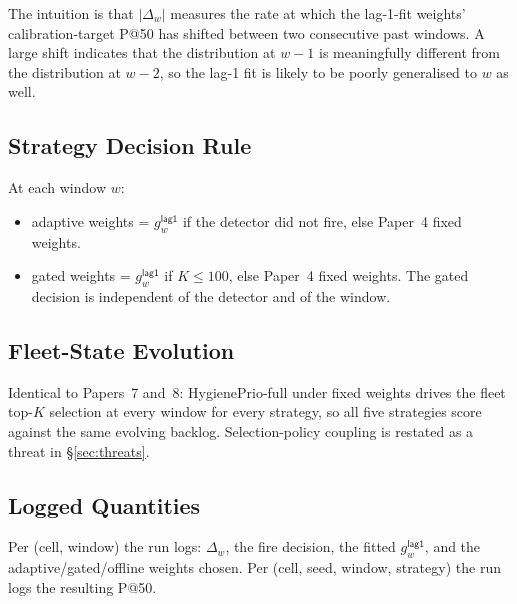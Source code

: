 The intuition is that $|\Delta_w|$ measures the rate at which the
lag-1-fit weights' calibration-target P@50 has shifted between two
consecutive past windows. A large shift indicates that the
distribution at $w - 1$ is meaningfully different from the
distribution at $w - 2$, so the lag-1 fit is likely to be poorly
generalised to $w$ as well.

\subsection{Strategy Decision Rule}

At each window $w$:
\begin{itemize}
\item \textsf{adaptive} weights = $g^{\textsf{lag1}}_w$ if the
detector did not fire, else Paper~4 \textsf{fixed} weights.
\item \textsf{gated} weights = $g^{\textsf{lag1}}_w$ if $K \leq 100$,
else Paper~4 \textsf{fixed} weights. The gated decision is
independent of the detector and of the window.
\end{itemize}

\subsection{Fleet-State Evolution}

Identical to Papers~7 and~8: HygienePrio-full under \textsf{fixed}
weights drives the fleet top-$K$ selection at every window for every
strategy, so all five strategies score against the same evolving
backlog. Selection-policy coupling is restated as a threat in
\S\ref{sec:threats}.

\subsection{Logged Quantities}

Per (cell, window) the run logs: $\Delta_w$, the fire decision, the
fitted $g^{\textsf{lag1}}_w$, and the
\textsf{adaptive}/\textsf{gated}/\textsf{offline} weights chosen.
Per (cell, seed, window, strategy) the run logs the resulting P@50.
